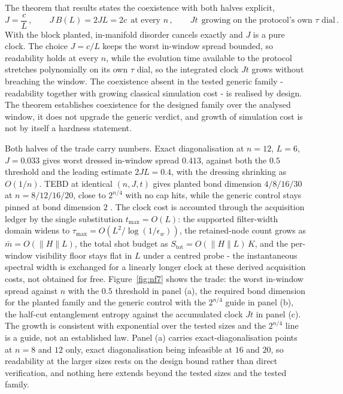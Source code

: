 The theorem that results states the coexistence with both halves explicit,
\begin{equation}\label{thm:planted-escape}
J = \frac{c}{L}\,, \qquad J\,B(L) = 2JL = 2c \ \ \text{at every } n\,, \qquad Jt \ \ \text{growing on the protocol's own } \tau \text{ dial}\,.
\end{equation}
With the block planted, in-manifold disorder cancels exactly and $J$ is a pure clock. The choice $J = c/L$ keeps the worst in-window spread bounded, so readability holds at every $n$, while the evolution time available to the protocol stretches polynomially on its own $\tau$ dial, so the integrated clock $Jt$ grows without breaching the window. The coexistence absent in the tested generic family - readability together with growing classical simulation cost - is realised by design. The theorem establishes coexistence for the designed family over the analysed window, it does not upgrade the generic verdict, and growth of simulation cost is not by itself a hardness statement.

Both halves of the trade carry numbers. Exact diagonalisation at $n = 12$, $L = 6$, $J = 0.033$ gives worst dressed in-window spread $0.413$, against both the $0.5$ threshold and the leading estimate $2JL = 0.4$, with the dressing shrinking as $O(1/n)$. TEBD at identical $(n, J, t)$ gives planted bond dimension $4/8/16/30$ at $n = 8/12/16/20$, close to $2^{n/4}$ with no cap hits, while the generic control stays pinned at bond dimension $2$ \cite{verstraete2008mps}. The clock cost is accounted through the acquisition ledger by the single substitution $t_{\max} = O(L)$: the supported filter-width domain widens to $\tau_{\max} = O(L^{2}/\log(1/\epsilon_{w}))$, the retained-node count grows as $\bar{m} = O(\lVert H\rVert L)$, the total shot budget as $S_{\mathrm{tot}} = O(\lVert H\rVert L)\,K$, and the per-window visibility floor stays flat in $L$ under a centred probe - the instantaneous spectral width is exchanged for a linearly longer clock at these derived acquisition costs, not obtained for free. Figure~\ref{fig:nf7} shows the trade: the worst in-window spread against $n$ with the $0.5$ threshold in panel (a), the required bond dimension for the planted family and the generic control with the $2^{n/4}$ guide in panel (b), the half-cut entanglement entropy against the accumulated clock $Jt$ in panel (c). The growth is consistent with exponential over the tested sizes and the $2^{n/4}$ line is a guide, not an established law. Panel (a) carries exact-diagonalisation points at $n = 8$ and $12$ only, exact diagonalisation being infeasible at $16$ and $20$, so readability at the larger sizes rests on the design bound rather than direct verification, and nothing here extends beyond the tested sizes and the tested family.

